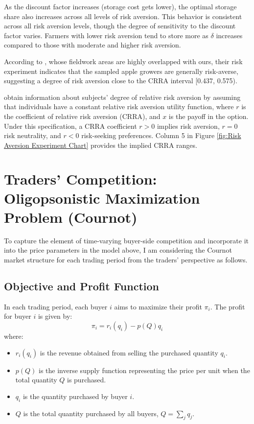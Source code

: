 \documentclass[12pt]{article}
\begin{document}
As the discount factor increases (storage cost gets lower), the optimal storage share also increases across all levels of risk aversion. This behavior is consistent across all risk aversion levels, though the degree of sensitivity to the discount factor varies. Farmers with lower risk aversion tend to store more as \(\delta\) increases compared to those with moderate and higher risk aversion.


According to \cite{jin2024losses}, whose fieldwork areas are highly overlapped with ours, their risk experiment indicates that the sampled apple growers are generally risk-averse, suggesting a degree of risk aversion close to the CRRA interval [0.437, 0.575). 

\cite{jin2017farmers} obtain information about subjects’ degree of relative risk aversion by assuming that individuals have a constant relative risk aversion utility function, where $r$ is the coefficient of relative risk aversion (CRRA), and $x$ is the payoff in the option. Under this specification, a CRRA coefficient $r > 0$ implies risk aversion, $r = 0$ risk neutrality, and $r < 0$ risk-seeking preferences. Column 5 in Figure \ref{fig:Risk Aversion Experiment Chart} provides the implied CRRA ranges.





\newpage
\section{Traders' Competition: Oligopsonistic Maximization Problem (Cournot)}

To capture the element of time-varying buyer-side competition and incorporate it into the price parameters in the model above, I am considering the Cournot market structure for each trading period from the traders' perspective as follows. 

\subsection{Objective and Profit Function}
In each trading period, each buyer \( i \) aims to maximize their profit \( \pi_i \). The profit for buyer \( i \) is given by:
\begin{equation}
\pi_i = r_i(q_i) - p(Q) q_i
\end{equation}
where:
\begin{itemize}
  \item \( r_i(q_i) \) is the revenue obtained from selling the purchased quantity \( q_i \).
  \item \( p(Q) \) is the inverse supply function representing the price per unit when the total quantity \( Q \) is purchased.
  \item \( q_i \) is the quantity purchased by buyer \( i \).
  \item \( Q \) is the total quantity purchased by all buyers, \( Q = \sum_{j} q_j \).
\end{itemize}
\end{document}
